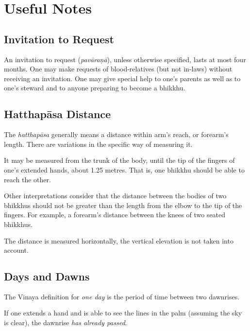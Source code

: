 \chapter{Useful Notes}

\vspace*{-\baselineskip}

\section*{Invitation to Request}

An invitation to request (\emph{pavāraṇā}), unless otherwise specified, lasts at
most four months. One may make requests of blood-relatives (but not in-laws)
without receiving an invitation. One may give special help to one's parents as
well as to one's steward and to anyone preparing to become a bhikkhu.\\

\vspace*{-\baselineskip}

\section*{Hatthapāsa Distance}

The \emph{hatthapāsa} generally means a distance within arm's reach, or
forearm's length. There are variations in the specific way of measuring it.

It may be measured from the trunk of the body, until the tip of the fingers of
one's extended hands, about 1.25 metres. That is, one bhikkhu should be able to
reach the other.

Other interpretations consider that the distance between the bodies of two
bhikkhus should not be greater than the length from the elbow to the tip of the
fingers. For example, a forearm's distance between the knees of two seated
bhikkhus.

The distance is measured horizontally, the vertical elevation is not taken into
account.

\section*{Days and Dawns}

The Vinaya definition for \emph{one day} is the period of time between two
dawnrises.

If one extends a hand and is able to see the lines in the palm (assuming the sky is clear), the dawnrise
\emph{has already passed}.

